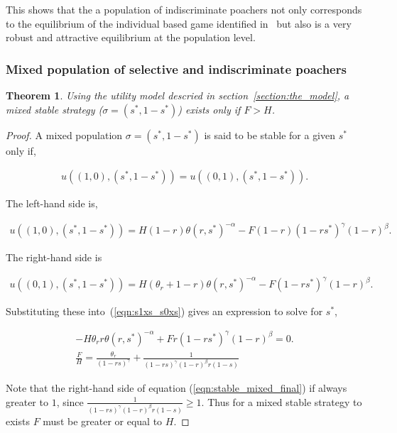 \documentclass[10pt]{article}
\newtheorem{theorem}{Theorem}
\begin{document}
This shows that the a population of indiscriminate poachers 
not only corresponds to the equilibrium of the individual based 
game identified in~\cite{Lee} but also is a very robust and attractive 
equilibrium at the population level.

\subsubsection{Mixed population of selective and indiscriminate poachers}

\begin{theorem}	
Using the utility model descried in section~\ref{section:the_model}, a mixed
stable strategy (\(\sigma=(s^*, 1 - s^*)\)) exists only if \(F > H\).  
\end{theorem}

\begin{proof}
	A mixed population \(\sigma = (s^*, 1 - s^*)\) is said to be stable for a
	given \(s^*\) only if,

	\begin{eqnarray}
	\label{eqn:s1xs_s0xs}
	u((1, 0),(s^*, 1 - s^*)) = u((0, 1),(s^*, 1 - s^*)).
	\end{eqnarray}

	The left-hand side is,

	\begin{eqnarray} \nonumber
	u((1, 0),(s^*, 1 - s^*)) =
	H(1 - r) \theta(r, s^*)^{-\alpha} - F (1 - r)(1 - rs^*)^{\gamma}(1 - r)^{\beta} .
	\end{eqnarray}

	The right-hand side is

	\begin{eqnarray} \nonumber
	u((0, 1),(s^*, 1 - s^*)) =
	H(\theta_r + 1 - r)\theta(r, s^*)^{-\alpha} - F(1 - rs^*)^{\gamma}(1 - r)^{\beta} .
	\end{eqnarray}

	Substituting these into~(\ref{eqn:s1xs_s0xs}) gives an expression to solve 
	for \(s^*\),

	\begin{eqnarray}
	\label{eqn:stablemixed}
	- H \theta_r r \theta(r, s^*)^{-\alpha}  + F r (1 - rs^*)^{\gamma}(1 - r)^{\beta} = 0.
	\\
	\label{eqn:stable_mixed_final}
	\frac{F}{H} = \frac{\theta_r}{(1 - rs) ^ {\gamma}} + \frac{1}{(1 - rs) ^ \gamma
	(1- r) ^ {\beta} r (1- s)}
	\end{eqnarray}

	Note that the right-hand side of equation (\ref{eqn:stable_mixed_final})
	if always greater to \(1\), since \(\frac{1}{(1 - rs) ^ \gamma(1- r) ^ {\beta} 
	r (1- s)} \geq 1\). Thus for a mixed stable strategy to exists \(F\) must be
	greater or equal to \(H\).
\end{proof}
\end{document}
